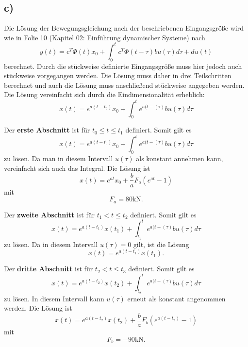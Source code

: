 \documentclass[11pt]{scrartcl} %
\begin{document}
\subsection*{c)}
Die Lösung der Bewegungsgleichung nach der beschriebenen Eingangsgröße wird wie in Folie 10 (Kapitel 02: Einführung dynamischer Systeme) nach
\begin{equation*}
y(t)=c^T\Phi(t)x_0+\int_{0}^{t}c^T\Phi(t-\tau)bu(\tau)d\tau + du(t)
\end{equation*}
berechnet. Durch die stückweise definierte Eingangsgröße muss hier jedoch auch stückweise vorgegangen werden. Die Lösung muss daher in drei Teilschritten berechnet und auch die Lösung muss anschließend stückweise angegeben werden.\\
Die Lösung vereinfacht sich durch die Eindimensionalität erheblich:
\begin{equation*}
x(t)=e^{a(t-t_0)}x_0+\int_{0}^{t}e^{a(t-(\tau)}bu(\tau)d\tau
\end{equation*}

Der \textbf{erste Abschnitt} ist für $t_0\leq t \leq t_1$ definiert. Somit gilt es
\begin{equation*}
x(t)=e^{a(t-t_0)}x_0+\int_{0}^{t}e^{a(t-(\tau)}bu(\tau)d\tau
\end{equation*}
zu lösen. Da man in diesem Intervall $u(\tau)$ als konstant annehmen kann, vereinfacht sich auch das Integral. Die Lösung ist 
\begin{equation*}
x(t)=e^{at}x_0 + \dfrac{b}{a} F_a (e^{at} - 1)
\end{equation*}
mit
\begin{equation*}
F_a = 80 \text{kN}.
\end{equation*}

Der \textbf{zweite Abschnitt} ist für $t_1 < t \leq t_2$ definiert. Somit gilt es
\begin{equation*}
x(t)=e^{a(t-t_1)}x(t_1)+\int_{t_1}^{t}e^{a(t-(\tau)}bu(\tau)d\tau
\end{equation*}
zu lösen. Da in diesem Intervall $u(\tau) = 0$ gilt, ist die Lösung 
\begin{equation*}
x(t)=e^{a(t-t_1)}x(t_1).
\end{equation*}

Der \textbf{dritte Abschnitt} ist für $t_2 < t \leq t_3$ definiert. Somit gilt es
\begin{equation*}
x(t)=e^{a(t-t_2)}x(t_2)+\int_{t_2}^{t}e^{a(t-(\tau)}bu(\tau)d\tau
\end{equation*}
zu lösen. In diesem Intervall kann $u(\tau)$ erneut als konstant angenommen werden. Die Lösung ist
\begin{equation*}
x(t)=e^{a(t-t_2)}x(t_2) + \dfrac{b}{a} F_b (e^{a(t-t_2)} - 1)
\end{equation*}
mit
\begin{equation*}
F_b = -90 \text{kN}.
\end{equation*}
\end{document}
